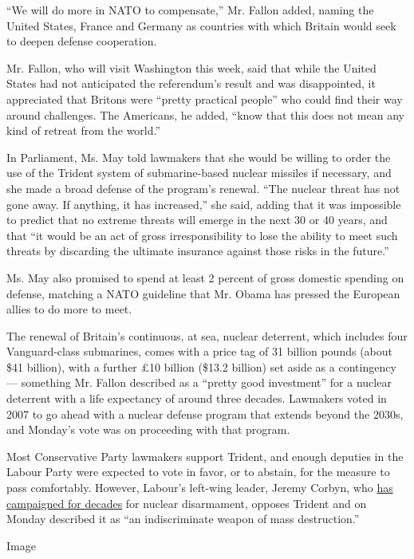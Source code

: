 ``We will do more in NATO to compensate,'' Mr. Fallon added, naming the
United States, France and Germany as countries with which Britain would
seek to deepen defense cooperation.

Mr. Fallon, who will visit Washington this week, said that while the
United States had not anticipated the referendum's result and was
disappointed, it appreciated that Britons were ``pretty practical
people'' who could find their way around challenges. The Americans, he
added, ``know that this does not mean any kind of retreat from the
world.''

In Parliament, Ms. May told lawmakers that she would be willing to order
the use of the Trident system of submarine-based nuclear missiles if
necessary, and she made a broad defense of the program's renewal. ``The
nuclear threat has not gone away. If anything, it has increased,'' she
said, adding that it was impossible to predict that no extreme threats
will emerge in the next 30 or 40 years, and that ``it would be an act of
gross irresponsibility to lose the ability to meet such threats by
discarding the ultimate insurance against those risks in the future.''

Ms. May also promised to spend at least 2 percent of gross domestic
spending on defense, matching a NATO guideline that Mr. Obama has
pressed the European allies to do more to meet.

The renewal of Britain's continuous, at sea, nuclear deterrent, which
includes four Vanguard-class submarines, comes with a price tag of 31
billion pounds (about \$41 billion), with a further £10 billion (\$13.2
billion) set aside as a contingency --- something Mr. Fallon described
as a ``pretty good investment'' for a nuclear deterrent with a life
expectancy of around three decades. Lawmakers voted in 2007 to go ahead
with a nuclear defense program that extends beyond the 2030s, and
Monday's vote was on proceeding with that program.

Most Conservative Party lawmakers support Trident, and enough deputies
in the Labour Party were expected to vote in favor, or to abstain, for
the measure to pass comfortably. However, Labour's left-wing leader,
Jeremy Corbyn, who
\href{http://www.nytimes.com/2015/10/01/world/europe/jeremy-corbyn-labour-party-leader-says-hed-never-use-nuclear-weapons.html}{has
campaigned for decades} for nuclear disarmament, opposes Trident and on
Monday described it as ``an indiscriminate weapon of mass destruction.''

Image

